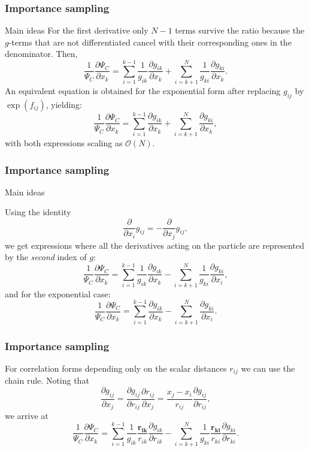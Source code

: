 \documentclass{beamer}
\begin{document}
\begin{frame}
\frametitle{Importance sampling}

\begin{block}{Main ideas }
For the first derivative only $N-1$ terms survive the ratio because the $g$-terms that are not differentiated cancel with their corresponding ones in the denominator. Then,
\[
\frac{1}{\Psi_C}\frac{\partial \Psi_C}{\partial x_k} =
\sum_{i=1}^{k-1}\frac{1}{g_{ik}}\frac{\partial g_{ik}}{\partial x_k}
+
\sum_{i=k+1}^{N}\frac{1}{g_{ki}}\frac{\partial g_{ki}}{\partial x_k}.
\]
An equivalent equation is obtained for the exponential form after replacing $g_{ij}$ by $\exp(f_{ij})$, yielding:
\[
\frac{1}{\Psi_C}\frac{\partial \Psi_C}{\partial x_k} =
\sum_{i=1}^{k-1}\frac{\partial g_{ik}}{\partial x_k}
+
\sum_{i=k+1}^{N}\frac{\partial g_{ki}}{\partial x_k},
\]
with both expressions scaling as $\mathcal{O}(N)$.
\end{block}
\end{frame}

\begin{frame}
\frametitle{Importance sampling}

\begin{block}{Main ideas }

Using the identity 
\[
\frac{\partial}{\partial x_i}g_{ij} = -\frac{\partial}{\partial x_j}g_{ij},
\]
we get expressions where all the derivatives acting on the particle  are represented by the \emph{second} index of $g$:
\[
\frac{1}{\Psi_C}\frac{\partial \Psi_C}{\partial x_k} =
\sum_{i=1}^{k-1}\frac{1}{g_{ik}}\frac{\partial g_{ik}}{\partial x_k}
-\sum_{i=k+1}^{N}\frac{1}{g_{ki}}\frac{\partial g_{ki}}{\partial x_i},
\]
and for the exponential case:
\[
\frac{1}{\Psi_C}\frac{\partial \Psi_C}{\partial x_k} =
\sum_{i=1}^{k-1}\frac{\partial g_{ik}}{\partial x_k}
-\sum_{i=k+1}^{N}\frac{\partial g_{ki}}{\partial x_i}.
\]
\end{block}
\end{frame}

\begin{frame}
\frametitle{Importance sampling}

\begin{block}{}
For correlation forms depending only on the scalar distances $r_{ij}$ we can use the chain rule. Noting that 
\[
\frac{\partial g_{ij}}{\partial x_j} = \frac{\partial g_{ij}}{\partial r_{ij}} \frac{\partial r_{ij}}{\partial x_j} = \frac{x_j - x_i}{r_{ij}} \frac{\partial g_{ij}}{\partial r_{ij}},
\]
we arrive at
\[
\frac{1}{\Psi_C}\frac{\partial \Psi_C}{\partial x_k} = 
\sum_{i=1}^{k-1}\frac{1}{g_{ik}} \frac{\mathbf{r_{ik}}}{r_{ik}} \frac{\partial g_{ik}}{\partial r_{ik}}
-\sum_{i=k+1}^{N}\frac{1}{g_{ki}}\frac{\mathbf{r_{ki}}}{r_{ki}}\frac{\partial g_{ki}}{\partial r_{ki}}.
\]
\end{block}
\end{frame}
\end{document}
